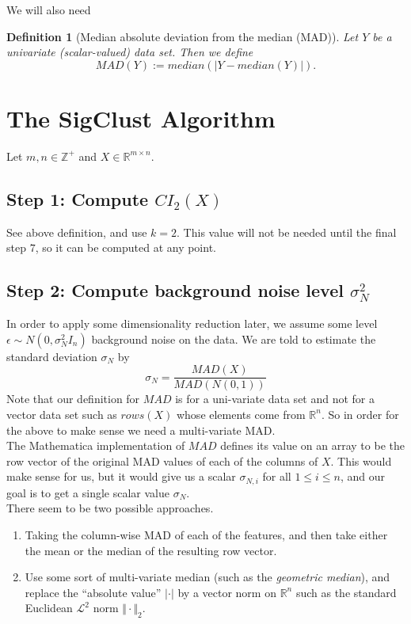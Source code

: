 \documentclass{article}
\newtheorem{definition}[theorem]{Definition}
\begin{document}
We will also need

\begin{definition}[Median absolute deviation from the median (MAD)]
Let $Y$ be a univariate (scalar-valued) data set.  Then we define
$$MAD(Y) := median(\vert Y - median(Y)\vert).$$
\end{definition}


\section{The SigClust Algorithm}
Let $m, n \in \mathbb{Z}^{+}$ and $X\in \mathbb{R}^{m \times n}$.

\subsection{Step 1:  Compute $CI_{2}(X)$}
See above definition, and use $k=2$.  This value will not be needed until the final step $7$, so it can be computed at any point. 

\subsection{Step 2: Compute background noise level $\sigma_{N}^2$}  In order to apply some dimensionality reduction later, we assume some level $\epsilon \sim N(0, \sigma^{2}_{N} I_{n})$ background noise on the data. We are told to estimate the standard deviation $\sigma_{N}$ by
$$\sigma_{N} = \frac{MAD(X)}{MAD(N(0,1))}$$
Note that our definition for $MAD$ is for a uni-variate data set and not for a vector data set such as $rows(X)$ whose elements come from $\mathbb{R}^{n}$.  So in order for the above to make sense we need a multi-variate MAD.\\
\indent The Mathematica implementation of $MAD$ defines its value on an array to be the row vector of the original MAD values of each of the columns of $X$.  This would make sense for us, but it would give us a scalar $\sigma_{N, i}$ for all $1\leq i \leq n$, and our goal is to get a single scalar value $\sigma_{N}$.\\
\indent There seem to be two possible approaches.
\begin{enumerate}
\item
Taking the column-wise MAD of each of the features, and then take either the mean or the median of the resulting row vector.
\item
Use some sort of multi-variate median (such as the \emph{geometric median}), and replace the ``absolute value'' $\lvert \cdot \vert$ by a vector norm on $\mathbb{R}^{n}$ such as the standard Euclidean $\mathscr{L}^{2}$ norm $\Vert \cdot \Vert_{2}$.
\end{enumerate}
\end{document}
